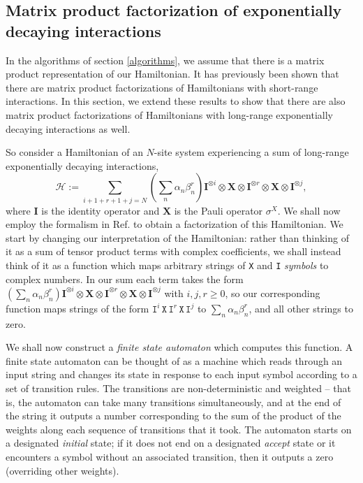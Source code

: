 \documentclass[12pt]{amsbook}
\theoremstyle{plain}
\theoremstyle{definition}
\theoremstyle{remark}
\newcommand{\paren}[1]{\left(#1\right)}
\begin{document}
\subsection{Matrix product factorization of exponentially decaying interactions}
\label{automaton}

In the algorithms of section \ref{algorithms}, we assume that there is a matrix product representation of our Hamiltonian.  It has previously been shown that there are matrix product factorizations of Hamiltonians with short-range interactions.\cite{cond-mat/0701428,caching}  In this section, we extend these results to show that there are also matrix product factorizations of Hamiltonians with long-range exponentially decaying interactions as well.

So consider a Hamiltonian of an $N$-site system experiencing a sum of long-range exponentially decaying interactions,
$$\mathcal{H}:=\sum_{i+1+r+1+j=N} \paren{\sum_n \alpha_n \beta_n^r} \textbf{I}^{\otimes i}\otimes \textbf{X} \otimes \textbf{I}^{\otimes r}\otimes \textbf{X} \otimes \textbf{I}^{\otimes j},$$ where $\textbf{I}$ is the identity operator and $\textbf{X}$ is the Pauli operator $\sigma^X$.  We shall now employ the formalism in Ref. \cite{caching} to obtain a factorization of this Hamiltonian.  We start by changing our interpretation of the Hamiltonian:  rather than thinking of it as a sum of tensor product terms with complex coefficients, we shall instead think of it as a function which maps arbitrary strings of \texttt{X} and \texttt{I} \emph{symbols} to complex numbers.  In our sum each term takes the form $\paren{\sum_n \alpha_n \beta_n^r} \textbf{I}^{\otimes i}\otimes \textbf{X} \otimes \textbf{I}^{\otimes r}\otimes \textbf{X} \otimes \textbf{I}^{\otimes j}$ with $i,j,r \ge 0$, so our corresponding function maps strings of the form $\texttt{I}^i\, \texttt{X}\, \texttt{I}^r\, \texttt{X}\, \texttt{I}^j$ to $\sum_n \alpha_n \beta_n^r$, and all other strings to zero.

We shall now construct a \emph{finite state automaton} which computes this function.  A finite state automaton can be thought of as a machine which reads through an input string and changes its state in response to each input symbol according to a set of transition rules.  The transitions are non-deterministic and weighted -- that is, the automaton can take many transitions simultaneously, and at the end of the string it outputs a number corresponding to the sum of the product of the weights along each sequence of transitions that it took.  The automaton starts on a designated \emph{initial} state;  if it does not end on a designated \emph{accept} state or it encounters a symbol without an associated transition, then it outputs a zero (overriding other weights).
\end{document}
